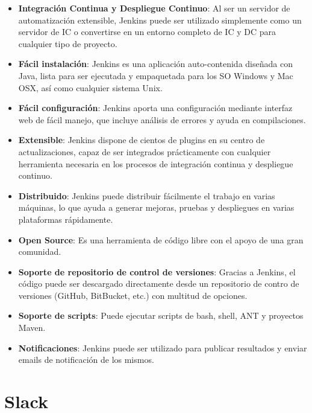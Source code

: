 \begin{itemize}
	\item \textbf{Integración Continua y Despliegue Continuo}: Al ser un servidor de automatización extensible, Jenkins puede ser utilizado simplemente como un servidor de \gls{IC} o convertirse en un entorno completo de \gls{IC} y \gls{DC} para cualquier tipo de proyecto.
	\item \textbf{Fácil instalación}: Jenkins es una aplicación auto-contenida diseñada con Java, lista para ser ejecutada  y empaquetada para los \gls{SO} Windows y Mac OSX, así como cualquier sistema Unix.
	\item \textbf{Fácil configuración}: Jenkins aporta una configuración mediante interfaz web de fácil manejo, que incluye análisis de errores y ayuda en compilaciones. 
	\item \textbf{Extensible}: Jenkins dispone de cientos de plugins en su centro de actualizaciones, capaz de ser integrados prácticamente con cualquier herramienta necesaria en los procesos de integración continua y despliegue continuo.
	\item \textbf{Distribuido}: Jenkins puede distribuir fácilmente el trabajo en varias máquinas, lo que ayuda a generar mejoras, pruebas y despliegues en varias plataformas rápidamente.
	\item \textbf{Open Source}: Es una herramienta de código libre con el apoyo de una gran comunidad.
	\item \textbf{Soporte de repositorio de control de versiones}: Gracias a Jenkins, el código puede ser descargado directamente desde un repositorio de contro de versiones (GitHub, BitBucket, etc.) con multitud de opciones.
	\item \textbf{Soporte de scripts}: Puede ejecutar scripts de bash, shell, ANT y proyectos Maven.
	\item \textbf{Notificaciones}: Jenkins puede ser utilizado para publicar resultados y enviar emails de notificación de los mismos.
\end{itemize}


\section{Slack}

